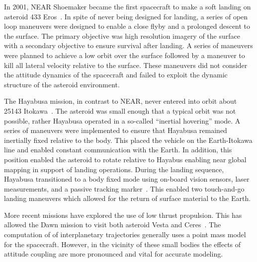 \documentclass[11pt,draft]{article} %
\begin{document}
In 2001, NEAR Shoemaker became the first spacecraft to make a soft landing on asteroid 433 Eros~\cite{antreasian2002}.
In spite of never being designed for landing, a series of open loop maneuvers were designed to enable a close flyby and a prolonged descent to the surface.
The primary objective was high resolution imagery of the surface with a secondary objective to ensure survival after landing.
A series of maneuvers were planned to achieve a low orbit over the surface followed by a maneuver to kill all lateral velocity relative to the surface. 
These maneuvers did not consider the attitude dynamics of the spacecraft and failed to exploit the dynamic structure of the asteroid environment.

The Hayabusa mission, in contrast to NEAR, never entered into orbit about 25143 Itokawa~\cite{kubota2006}.
The asteroid was small enough that a typical orbit was not possible, rather Hayabusa operated in a so-called ``inertial hovering'' mode.
A series of maneuvers were implemented to ensure that Hayabusa remained inertially fixed relative to the body. 
This placed the vehicle on the Earth-Itokawa line and enabled constant communication with the Earth.
In addition, this position enabled the asteroid to rotate relative to Hayabus enabling near global mapping in support of landing operations.
During the landing sequence, Hayabusa transitioned to a body fixed mode using on-board vision sensors, laser measurements, and a passive tracking marker~\cite{kubota2005}. 
This enabled two touch-and-go landing maneuvers which allowed for the return of surface material to the Earth. 

More recent missions have explored the use of low thrust propulsion.
This has allowed the Dawn mission to visit both asteroid Vesta and Ceres~\cite{rayman2006}.
The computation of of interplanetary trajectories generally uses a point mass model for the spacecraft.
However, in the vicinity of these small bodies the effects of attitude coupling are more pronounced and vital for accurate modeling. 
\end{document}
